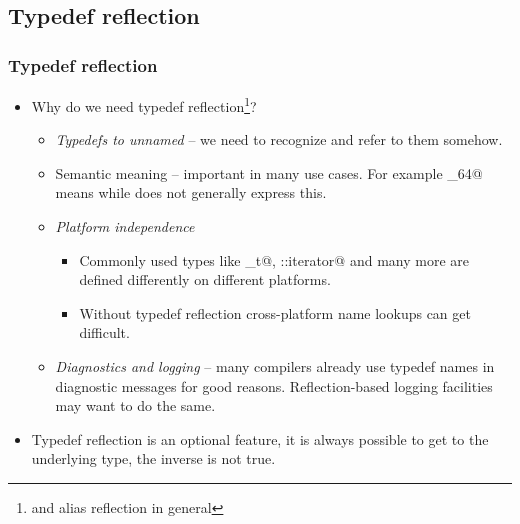 \documentclass[compress,table,xcolor=table]{beamer}
\begin{document}
\subsection{Typedef reflection}
\begin{frame}[fragile]
\frametitle{Typedef reflection}
  \small
  \begin{itemize}
    \item Why do we need typedef reflection\footnote{and alias reflection
      in general}?
    \begin{itemize}
      \footnotesize
      \item {\em Typedefs to unnamed \verb@struct@s} -- we need to recognize
      and refer to them somehow.
      \item Semantic meaning -- important in many use cases. For example
        \verb@int_64@ means  while \verb@long@ does not generally
	express this.
      \item {\em Platform independence}
        \begin{itemize}
          \item Commonly used types like \verb@size_t@, \verb@string::iterator@
          and many more are defined differently on different platforms.
          \item Without typedef reflection cross-platform name
          lookups can get difficult.
        \end{itemize}
      \item {\em Diagnostics and logging} -- many compilers already use typedef
        names in diagnostic messages for good reasons. Reflection-based logging
        facilities may want to do the same.
    \end{itemize}
    \item Typedef reflection is an optional feature, it is always possible to get
      to the underlying type, the inverse is not true.

  \end{itemize}
\end{frame}
\end{document}
